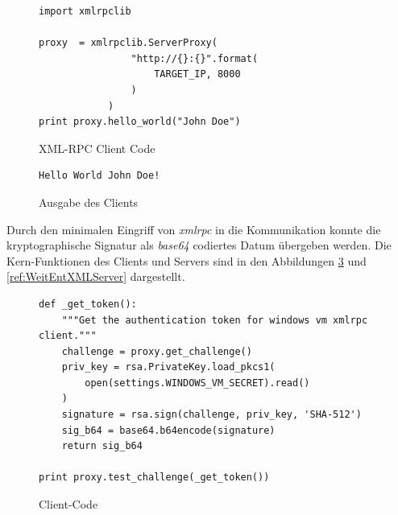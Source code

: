 \begin{figure}
\begin{lstlisting}
import xmlrpclib

proxy  = xmlrpclib.ServerProxy(
                "http://{}:{}".format(
                    TARGET_IP, 8000
                )
            )
print proxy.hello_world("John Doe")
\end{lstlisting}
\caption{XML-RPC Client Code}
\label{lst:WeitMobSFXMLRPCClientCode}
\end{figure}

\begin{figure}
\begin{lstlisting}
Hello World John Doe!
\end{lstlisting}
\caption{Ausgabe des Clients}
\label{lst:WeitMobSFXMLRPCClientAusgabe}
\end{figure}

Durch den minimalen Eingriff von \textit{xmlrpc} in die Kommunikation konnte die kryptographische Signatur als \textit{base64} codiertes Datum übergeben werden. Die Kern-Funktionen des Clients und Servers sind in den Abbildungen \ref{ref:WeitEntXMLClient} und \ref{ref:WeitEntXMLServer} dargestellt.\\

\begin{figure}
\begin{lstlisting}
def _get_token():
    """Get the authentication token for windows vm xmlrpc client."""
    challenge = proxy.get_challenge()
    priv_key = rsa.PrivateKey.load_pkcs1(
        open(settings.WINDOWS_VM_SECRET).read()
    )
    signature = rsa.sign(challenge, priv_key, 'SHA-512')
    sig_b64 = base64.b64encode(signature)
    return sig_b64
    
print proxy.test_challenge(_get_token())
\end{lstlisting}
\caption{Client-Code}
\label{ref:WeitEntXMLClient}
\end{figure}

